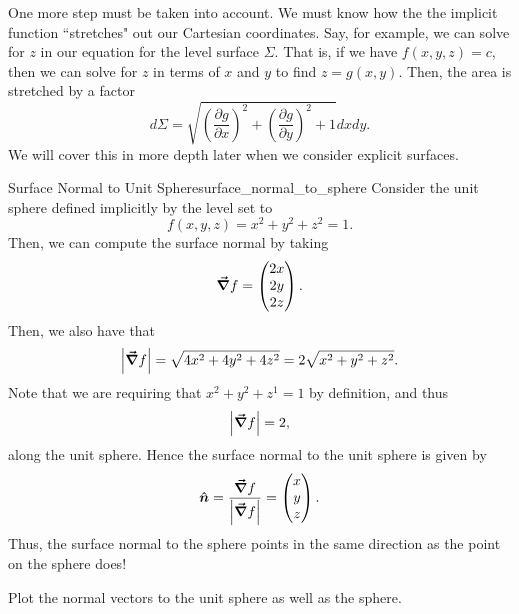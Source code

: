                  One more step must be taken into account.  We must know how the the implicit function ``stretches" out our Cartesian coordinates.  Say, for example, we can solve for $z$ in our equation for the level surface $\Sigma$. That is, if we have $f(x,y,z)=c$, then we can solve for $z$ in terms of $x$ and $y$ to find $z=g(x,y)$.  Then, the area is stretched by a factor
                 \[
                 d\Sigma = \sqrt{ \left(\frac{\partial g}{\partial x}\right)^2 + \left(\frac{\partial g}{\partial y}\right)^2 +1 } dxdy.
                 \]
                 We will cover this in more depth later when we consider explicit surfaces.
                 
                 \begin{ex}{Surface Normal to Unit Sphere}{surface_normal_to_sphere}
                 	Consider the unit sphere defined implicitly by the level set to
                 	\[
                 	f(x,y,z)=x^2+y^2+z^2 = 1.
                 	\]
                 	Then, we can compute the surface normal by taking
                 	\[
                 	\boldsymbol{\vec{\nabla}} f = \begin{pmatrix} 2x \\ 2y \\ 2z \end{pmatrix}.
                 	\]
                 	Then, we also have that
                 	\[
                 	\left| \boldsymbol{\vec{\nabla}} f \right| = \sqrt{4x^2+4y^2+4z^2} = 2 \sqrt{x^2+y^2+z^2}.
                 	\]
                 	Note that we are requiring that $x^2+y^2+z^1=1$ by definition, and thus
                 	\[
                 	\left| \boldsymbol{\vec{\nabla}} f\right| = 2,
                 	\]
                 	along the unit sphere. Hence the surface normal to the unit sphere is given by
                 	\[
                 	\boldsymbol{\hat{n}} = \frac{\boldsymbol{\vec{\nabla}} f}{\left| \boldsymbol{\vec{\nabla}} f \right|} = \begin{pmatrix} x \\ y \\ z \end{pmatrix}.
                 	\]
                 	Thus, the surface normal to the sphere points in the same direction as the point on the sphere does!
                 \end{ex}
                 
                 \begin{exercise}
                 	Plot the normal vectors to the unit sphere as well as the sphere.
                 \end{exercise}
                 
